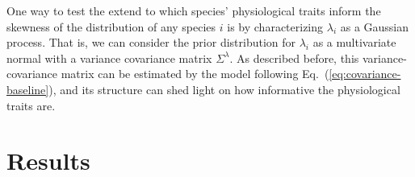 \documentclass[11pt, a4paper]{article}
\begin{document}
One way to test the extend to which species' physiological traits inform the skewness of the distribution of any species $i$ is by characterizing $\lambda_{i}$ as a Gaussian process. That is, we can consider the prior distribution for $\lambda_{i}$ as a multivariate normal with a variance covariance matrix $\Sigma^{\lambda}$. As described before, this variance-covariance matrix can be estimated by the model following Eq.~(\ref{eq:covariance-baseline}), and its structure can shed light on how informative the physiological traits are.


\section*{Results}



\end{document}
